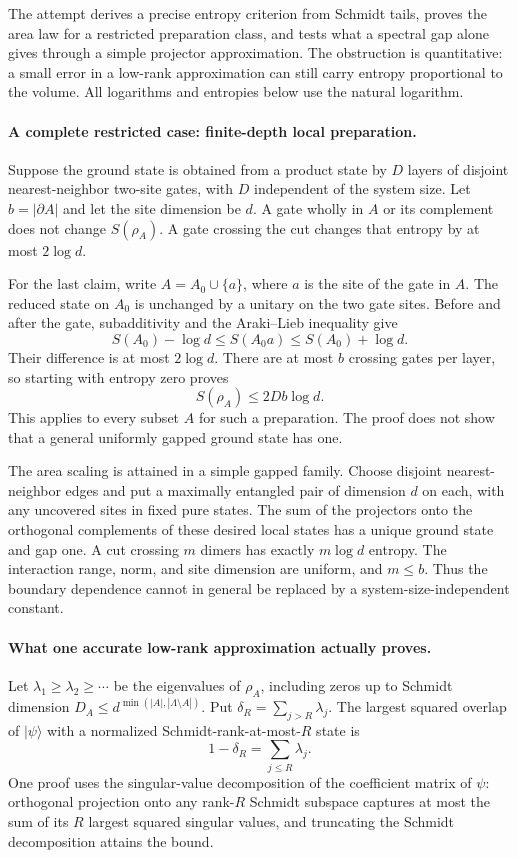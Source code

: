 \documentclass[11pt]{article}
\begin{document}
The attempt derives a precise entropy criterion from Schmidt tails,
proves the area law for a restricted preparation class, and tests what
a spectral gap alone gives through a simple projector approximation.
The obstruction is quantitative: a small error in a low-rank
approximation can still carry entropy proportional to the volume.
All logarithms and entropies below use the natural logarithm.

\paragraph{A complete restricted case: finite-depth local preparation.}
Suppose the ground state is obtained from a product state by $D$ layers
of disjoint nearest-neighbor two-site gates, with $D$ independent of
the system size. Let $b=|\partial A|$ and let the site dimension be $d$.
A gate wholly in $A$ or its complement does not change $S(\rho_A)$.
A gate crossing the cut changes that entropy by at most $2\log d$.

For the last claim, write $A=A_0\cup\{a\}$, where $a$ is the site
of the gate in $A$. The reduced state on $A_0$ is unchanged by a
unitary on the two gate sites. Before and after the gate,
subadditivity and the Araki--Lieb inequality give
\[
 S(A_0)-\log d\le S(A_0a)\le S(A_0)+\log d.
\]
Their difference is at most $2\log d$. There are at most $b$ crossing
gates per layer, so starting with entropy zero proves
\begin{equation}\label{area:circuit}
 S(\rho_A)\le 2Db\log d.
\end{equation}
This applies to every subset $A$ for such a preparation. The proof
does not show that a general uniformly gapped ground state has one.

The area scaling is attained in a simple gapped family. Choose disjoint
nearest-neighbor edges and put a maximally entangled pair of dimension
$d$ on each, with any uncovered sites in fixed pure states. The sum of
the projectors onto the orthogonal complements of these desired local
states has a unique ground state and gap one. A cut crossing $m$ dimers
has exactly $m\log d$ entropy. The interaction range, norm, and site
dimension are uniform, and $m\le b$. Thus the boundary dependence
cannot in general be replaced by a system-size-independent constant.

\paragraph{What one accurate low-rank approximation actually proves.}
Let $\lambda_1\ge\lambda_2\ge\cdots$ be the eigenvalues of $\rho_A$,
including zeros up to Schmidt dimension
$D_A\le d^{\min(|A|,|\Lambda\setminus A|)}$. Put
$\delta_R=\sum_{j>R}\lambda_j$. The largest squared overlap of
$|\psi\rangle$ with a normalized Schmidt-rank-at-most-$R$ state is
\[
 1-\delta_R=\sum_{j\le R}\lambda_j.
\]
One proof uses the singular-value decomposition of the coefficient
matrix of $\psi$: orthogonal projection onto any rank-$R$ Schmidt
subspace captures at most the sum of its $R$ largest squared singular
values, and truncating the Schmidt decomposition attains the bound.
\end{document}
